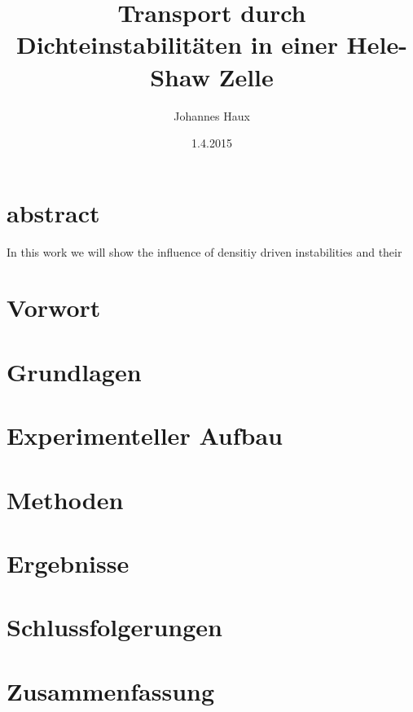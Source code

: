 \documentclass[twoside, a4paper, DIV=11,twocolumn]{book}
\title{Transport durch Dichteinstabilitäten in einer Hele-Shaw Zelle}
\author{Johannes Haux}
\date{1.4.2015}
\begin{document}
\onecolumn


\chapter*{abstract}
  
  In this work we will show the influence of densitiy driven instabilities and their 
\twocolumn
\tableofcontents
\listoffigures

\balance %
\chapter{Vorwort}


\chapter{Grundlagen}


\chapter{Experimenteller Aufbau}


\chapter{Methoden}


\chapter{Ergebnisse}


\chapter{Schlussfolgerungen}


\chapter{Zusammenfassung}





\end{document}
